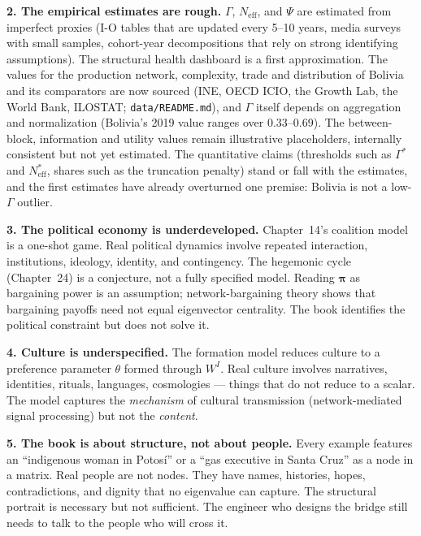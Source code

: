 \documentclass[../structural_economics_book.tex]{subfiles}
\begin{document}
\textbf{2. The empirical estimates are rough.} $\Gamma$, $N_{\text{eff}}$, and $\Psi$ are estimated from imperfect proxies (I-O tables that are updated every 5--10 years, media surveys with small samples, cohort-year decompositions that rely on strong identifying assumptions). The structural health dashboard is a first approximation. The values for the production network, complexity, trade and distribution of Bolivia and its comparators are now sourced (INE, OECD ICIO, the Growth Lab, the World Bank, ILOSTAT; \texttt{data/README.md}), and $\Gamma$ itself depends on aggregation and normalization (Bolivia's 2019 value ranges over 0.33--0.69). The between-block, information and utility values remain illustrative placeholders, internally consistent but not yet estimated. The quantitative claims (thresholds such as $\Gamma^*$ and $N^*_{\text{eff}}$, shares such as the truncation penalty) stand or fall with the estimates, and the first estimates have already overturned one premise: Bolivia is not a low-$\Gamma$ outlier.

\textbf{3. The political economy is underdeveloped.} Chapter~14's coalition model is a one-shot game. Real political dynamics involve repeated interaction, institutions, ideology, identity, and contingency. The hegemonic cycle (Chapter~24) is a conjecture, not a fully specified model. Reading $\boldsymbol{\pi}$ as bargaining power is an assumption; network-bargaining theory \citep{manea2011bargaining,abreu2012bargaining} shows that bargaining payoffs need not equal eigenvector centrality. The book identifies the political constraint but does not solve it.

\textbf{4. Culture is underspecified.} The formation model reduces culture to a preference parameter $\theta$ formed through $W^I$. Real culture involves narratives, identities, rituals, languages, cosmologies --- things that do not reduce to a scalar. The model captures the \textit{mechanism} of cultural transmission (network-mediated signal processing) but not the \textit{content}.

\textbf{5. The book is about structure, not about people.} Every example features an ``indigenous woman in Potos\'{i}'' or a ``gas executive in Santa Cruz'' as a node in a matrix. Real people are not nodes. They have names, histories, hopes, contradictions, and dignity that no eigenvalue can capture. The structural portrait is necessary but not sufficient. The engineer who designs the bridge still needs to talk to the people who will cross it.
\end{document}
